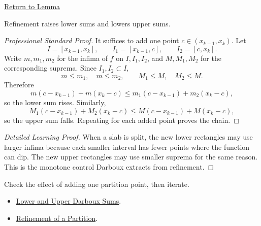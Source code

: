 \newpage
{}
\label{prf:darboux-refinement-squeeze}
\begin{remark*}[Return]\hyperref[lem:darboux-refinement-squeeze]{Return to Lemma}\end{remark*}
\begin{lemma*}
Refinement raises lower sums and lowers upper sums.
\end{lemma*}
\begin{proof}[Professional Standard Proof]
\LRAProofBodyStart
It suffices to add one point \(c\in(x_{k-1},x_k)\). Let
\[
  I=[x_{k-1},x_k],\qquad I_1=[x_{k-1},c],\qquad I_2=[c,x_k].
\]
Write \(m,m_1,m_2\) for the infima of \(f\) on \(I,I_1,I_2\), and
\(M,M_1,M_2\) for the corresponding suprema. Since \(I_1,I_2\subset I\),
\[
  m\le m_1,\quad m\le m_2,\qquad M_1\le M,\quad M_2\le M.
\]
Therefore
\[
  m(c-x_{k-1})+m(x_k-c)
  \le m_1(c-x_{k-1})+m_2(x_k-c),
\]
so the lower sum rises. Similarly,
\[
  M_1(c-x_{k-1})+M_2(x_k-c)
  \le M(c-x_{k-1})+M(x_k-c),
\]
so the upper sum falls. Repeating for each added point proves the chain.
\end{proof}
\begin{proof}[Detailed Learning Proof]
\LRAProofBodyStart
When a slab is split, the new lower rectangles may use larger infima because
each smaller interval has fewer points where the function can dip. The new
upper rectangles may use smaller suprema for the same reason. This is the
monotone control Darboux extracts from refinement.
\end{proof}
\begin{remark*}
Check the effect of adding one partition point, then iterate.
\end{remark*}
\begin{dependencies}
\begin{itemize}
  \item \hyperref[def:darboux-sums]{Lower and Upper Darboux Sums}.
  \item \hyperref[def:partition-refinement]{Refinement of a Partition}.
\end{itemize}
\end{dependencies}
\clearpage
